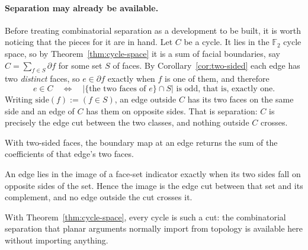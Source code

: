 \paragraph{Separation may already be available.}
Before treating combinatorial separation as a development to be built, it is
worth noticing that the pieces for it are in hand. Let $C$ be a cycle. It
lies in the $\mathbb{F}_2$ cycle space, so by Theorem~\ref{thm:cycle-space}
it is a sum of facial boundaries, say $C = \sum_{f \in S} \partial f$ for
some set $S$ of faces. By Corollary~\ref{cor:two-sided} each edge has two
\emph{distinct} faces, so $e \in \partial f$ exactly when $f$ is one of them,
and therefore
\[
  e \in C \quad\Longleftrightarrow\quad
  \bigl|\{\text{the two faces of } e\} \cap S\bigr| \text{ is odd,
  that is, exactly one.}
\]
Writing $\mathrm{side}(f) := (f \in S)$, an edge outside $C$ has its two
faces on the same side and an edge of $C$ has them on opposite sides. That
is separation: $C$ is precisely the edge cut between the two classes, and
nothing outside $C$ crosses.

\begin{theorem}\label{thm:pair-sum}
With two-sided faces, the boundary map at an edge returns the sum of the
coefficients of that edge's two faces.
\end{theorem}

\begin{corollary}\label{cor:separation}
An edge lies in the image of a face-set indicator exactly when its two sides
fall on opposite sides of the set. Hence the image is the edge cut between
that set and its complement, and no edge outside the cut crosses it.
\end{corollary}

With Theorem~\ref{thm:cycle-space}, every cycle is such a cut: the
combinatorial separation that planar arguments normally import from topology
is available here without importing anything.

